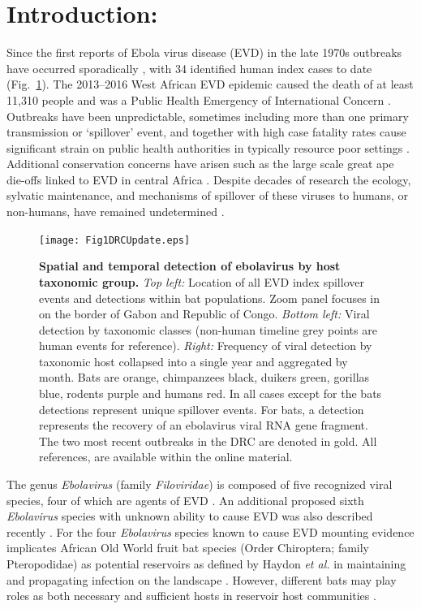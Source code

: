 \documentclass[a4paper,twoside, onecolumn]{article}
\begin{document}
	\section*{Introduction:}
	Since the first reports of Ebola virus disease (EVD) in the late 1970s outbreaks have occurred sporadically \cite{Pourrut2005}, with 34 identified human index cases to date (Fig.~\ref{fig:F1}). The 2013--2016 West African EVD epidemic caused the death of at least 11,310 people and was a Public Health Emergency of International Concern \cite{Briand2014}. Outbreaks have been unpredictable, sometimes including more than one primary transmission or ‘spillover’ event, and together with high case fatality rates cause significant strain on public health authorities in typically resource poor settings \cite{Pigott2016}. Additional conservation concerns have arisen such as the large scale great ape die-offs linked to EVD in central Africa \cite{Leroy2004}. Despite decades of research the ecology, sylvatic maintenance, and mechanisms of spillover of these viruses to humans, or non-humans, have remained undetermined \cite{Olival2014}.\par
	\begin{figure}[h!]
		\centering
		\texttt{[image: Fig1DRCUpdate.eps]}
		\caption{\textbf{Spatial and temporal detection of ebolavirus by host taxonomic group.} \textit{Top left:} Location of all EVD index spillover events and detections within bat populations. Zoom panel focuses in on the border of Gabon and Republic of Congo. \textit{Bottom left:} Viral detection by taxonomic classes (non-human timeline grey points are human events for reference). \textit{Right:} Frequency of viral detection by taxonomic host collapsed into a single year and aggregated by month. Bats are orange, chimpanzees black, duikers green, gorillas blue, rodents purple and humans red. In all cases except for the bats detections represent unique spillover events. For bats, a detection represents the recovery of an ebolavirus viral RNA gene fragment. The two most recent outbreaks in the DRC are denoted in gold. All references, are available within the online material.}
		\label{fig:F1}
	\end{figure}
	The genus \textit{Ebolavirus} (family \textit{Filoviridae}) is composed of five recognized viral species, four of which are agents of EVD \cite{Olival2014}. An additional proposed sixth \textit{Ebolavirus} species with unknown ability to cause EVD was also described recently \cite{Goldstein2018}. For the four \textit{Ebolavirus} species known to cause EVD mounting evidence implicates African Old World fruit bat species (Order Chiroptera; family Pteropodidae) as potential reservoirs as defined by Haydon \textit{et al.} \cite{Haydon2002} in maintaining and propagating infection on the landscape \cite{DeNys2018, Leroy2005, Han2016, Pourrut2009}. However, different bats may play roles as both necessary and sufficient hosts in reservoir host communities \cite{nishiura2009find}.	
\end{document}
